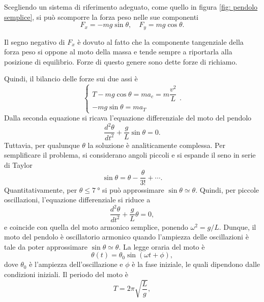Scegliendo un sistema di riferimento adeguato, come quello in figura \ref{fig: pendolo semplice}, si può scomporre la forza peso nelle sue componenti
\begin{equation}
    F_x=-mg\sin{\theta},\quad F_y=mg\cos{\theta}.
\end{equation}
\begin{obs}
    Il segno negativo di $F_x$ è dovuto al fatto che la componente tangenziale della forza peso si oppone al moto della massa e tende sempre a riportarla alla posizione di equilibrio. Forze di questo genere sono dette forze di richiamo.
\end{obs}
Quindi, il bilancio delle forze sui due assi è
\begin{equation}
    \begin{cases}
        T-mg\cos{\theta}=ma_c=m\dfrac{v^2}{L} \\
        -mg\sin{\theta}=ma_T
    \end{cases}.
\end{equation}
Dalla seconda equazione si ricava l'equazione differenziale del moto del pendolo
\begin{equation}
    \frac{d^2\theta}{dt^2}+\frac{g}{L}\sin{\theta}=0.
\end{equation}
Tuttavia, per qualunque $\theta$ la soluzione è analiticamente complessa. Per semplificare il problema, si considerano angoli piccoli e si espande il seno in serie di Taylor 
\begin{equation}
    \sin{\theta}=\theta-\frac{\theta}{3!}+\cdots.
\end{equation}
Quantitativamente, per $\theta\le\SI{7}{\degree}$ si può approssimare $\sin{\theta}\simeq\theta$. Quindi, per piccole oscillazioni, l'equazione differenziale si riduce a
\begin{equation}
    \frac{d^2\theta}{dt^2}+\frac{g}{L}\theta=0,
\end{equation}
e coincide con quella del moto armonico semplice, ponendo $\omega^2=g/L$. Dunque, il moto del pendolo è oscillatorio armonico quando l'ampiezza delle oscillazioni è tale da poter approssimare $\sin{\theta}\simeq\theta$. La legge oraria del moto è
\begin{equation}
    \theta(t)=\theta_0\sin{(\omega t+\phi)},
\end{equation}
dove $\theta_0$ è l'ampiezza dell'oscillazione e $\phi$ è la fase iniziale, le quali dipendono dalle condizioni iniziali. Il periodo del moto è
\begin{equation}
    T=2\pi\sqrt{\frac{L}{g}},
\end{equation}
